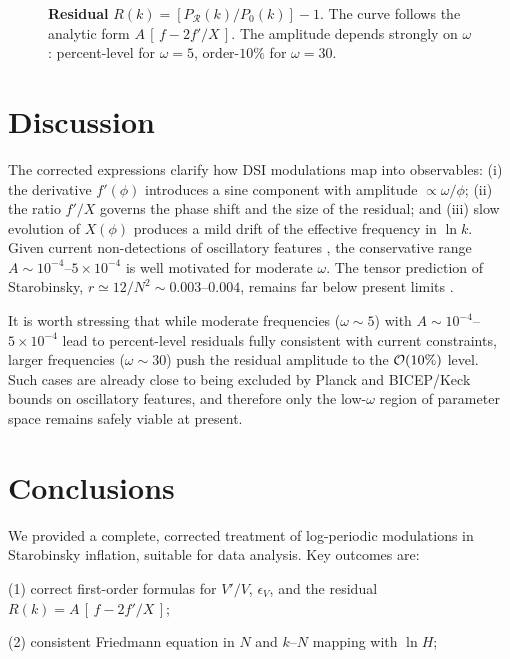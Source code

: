 \documentclass[12pt]{article}
\begin{document}
\begin{figure}[t]
\centering
\caption{\textbf{Residual} $R(k)=[P_{\mathcal R}(k)/P_{0}(k)]-1$. The curve follows the analytic form $A\,[\,f-2f'/X\,]$. The amplitude depends strongly on $\omega$: percent-level for $\omega=5$, order-$10\%$ for $\omega=30$.}
\label{fig:residual}
\end{figure}

\section{Discussion}
\label{sec:discussion}

The corrected expressions clarify how DSI modulations map into observables:
(i) the derivative $f'(\phi)$ introduces a sine component with amplitude $\propto \omega/\phi$;
(ii) the ratio $f'/X$ governs the phase shift and the size of the residual; and
(iii) slow evolution of $X(\phi)$ produces a mild drift of the effective frequency in $\ln k$.
Given current non-detections of oscillatory features \cite{Meerburg2014,Planck2018Inflation}, the conservative range $A\sim 10^{-4}$--$5\times10^{-4}$ is well motivated for moderate $\omega$.
The tensor prediction of Starobinsky, $r\simeq 12/N^2\sim 0.003$--$0.004$, remains far below present limits \cite{Paoletti2022}.

It is worth stressing that while moderate frequencies ($\omega\sim 5$) with $A\sim10^{-4}$--$5\times10^{-4}$ lead to percent-level residuals fully consistent with current constraints, larger frequencies ($\omega\sim 30$) push the residual amplitude to the ${\cal O}(10\%)$ level. Such cases are already close to being excluded by Planck and BICEP/Keck bounds on oscillatory features, and therefore only the low-$\omega$ region of parameter space remains safely viable at present.

\section{Conclusions}

We provided a complete, corrected treatment of log-periodic modulations in Starobinsky inflation, suitable for data analysis. Key outcomes are:

(1) correct first-order formulas for $V'/V$, $\epsilon_V$, and the residual 
$R(k)=A\,[\,f-2f'/X\,]$;

(2) consistent Friedmann equation in $N$ and $k$--$N$ mapping with $\ln H$;
\end{document}
